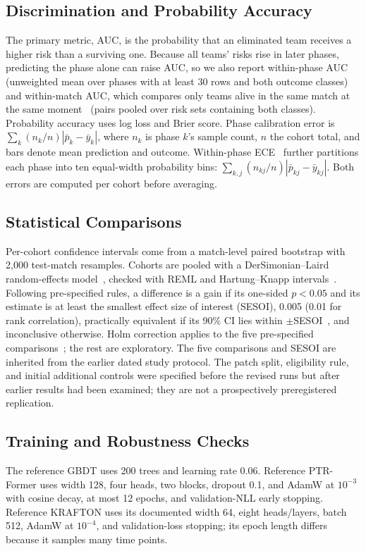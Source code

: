 \documentclass[sigconf,anonymous,nonacm]{acmart}
\begin{document}
\subsection{Discrimination and Probability Accuracy}
The primary metric, AUC, is the probability that an eliminated team receives a higher risk than a surviving one.
Because all teams' risks rise in later phases, predicting the phase alone can raise AUC, so we also report within-phase AUC (unweighted mean over phases with at least 30 rows and both outcome classes) and within-match AUC, which compares only teams alive in the same match at the same moment~\cite{HeagertyZheng05} (pairs pooled over risk sets containing both classes).
Probability accuracy uses log loss and Brier score. Phase calibration error is $\sum_k(n_k/n)|\bar p_k-\bar y_k|$, where $n_k$ is phase $k$'s sample count, $n$ the cohort total, and bars denote mean prediction and outcome. Within-phase ECE~\cite{Naeini15} further partitions each phase into ten equal-width probability bins: $\sum_{k,j}(n_{kj}/n)|\bar p_{kj}-\bar y_{kj}|$. Both errors are computed per cohort before averaging.

\subsection{Statistical Comparisons}
Per-cohort confidence intervals come from a match-level paired bootstrap with 2,000 test-match resamples.
Cohorts are pooled with a DerSimonian--Laird random-effects model~\cite{DerSimonian86}, checked with REML and Hartung--Knapp intervals~\cite{HartungKnapp01}.
Following pre-specified rules, a difference is a gain if its one-sided $p<0.05$ and its estimate is at least the smallest effect size of interest (SESOI), 0.005 (0.01 for rank correlation), practically equivalent if its 90\% CI lies within $\pm$SESOI~\cite{Schuirmann87}, and inconclusive otherwise.
Holm correction applies to the five pre-specified comparisons~\cite{Holm79}; the rest are exploratory. The five comparisons and SESOI are inherited from the earlier dated study protocol. The patch split, eligibility rule, and initial additional controls were specified before the revised runs but after earlier results had been examined; they are not a prospectively preregistered replication.
\subsection{Training and Robustness Checks}
The reference GBDT uses 200 trees and learning rate 0.06. Reference PTR-Former uses width 128, four heads, two blocks, dropout 0.1, and AdamW at $10^{-3}$ with cosine decay, at most 12 epochs, and validation-NLL early stopping. Reference KRAFTON uses its documented width 64, eight heads/layers, batch 512, AdamW at $10^{-4}$, and validation-loss stopping; its epoch length differs because it samples many time points.
\end{document}
